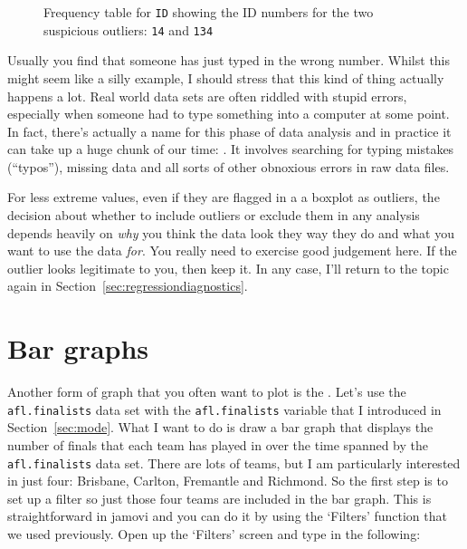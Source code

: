 \begin{figure}[htp]
\begin{center}
\caption{Frequency table for \texttt{ID} showing the ID numbers for the two suspicious outliers: \texttt{14} and \texttt{134}}
\label{fig:filter2}
\end{center}
\end{figure}

Usually you find that someone has just typed in the wrong number. Whilst this might seem like a silly example, I should stress that this kind of thing actually happens a lot. Real world data sets are often riddled with stupid errors, especially when someone had to type something into a computer at some point. In fact, there's actually a name for this phase of data analysis and in practice it can take up a huge chunk of our time: . It involves searching for typing mistakes (``typos''), missing data and all sorts of other obnoxious errors in raw data files.

For less extreme values, even if they are flagged in a a boxplot as outliers, the decision about whether to include outliers or exclude them in any analysis depends heavily on {\it why} you think the data look they way they do and what you want to use the data {\it for}. You really need to exercise good judgement here. If the outlier looks legitimate to you, then keep it. In any case, I'll return to the topic again in Section~\ref{sec:regressiondiagnostics}. 


\section{Bar graphs\label{sec:bargraph}}

Another form of graph that you often want to plot is the . Let's use the \texttt{afl.finalists} data set with the \texttt{afl.finalists} variable that I introduced in Section~\ref{sec:mode}. What I want to do is draw a bar graph that displays the number of finals that each team has played in over the time spanned by the \texttt{afl.finalists} data set. There are lots of teams, but I am particularly interested in just four: Brisbane, Carlton, Fremantle and Richmond. So the first step is to set up a filter so just those four teams are included in the bar graph. This is straightforward in jamovi and you can do it by using the `Filters' function that we used previously. Open up the `Filters' screen and type in the following: 

